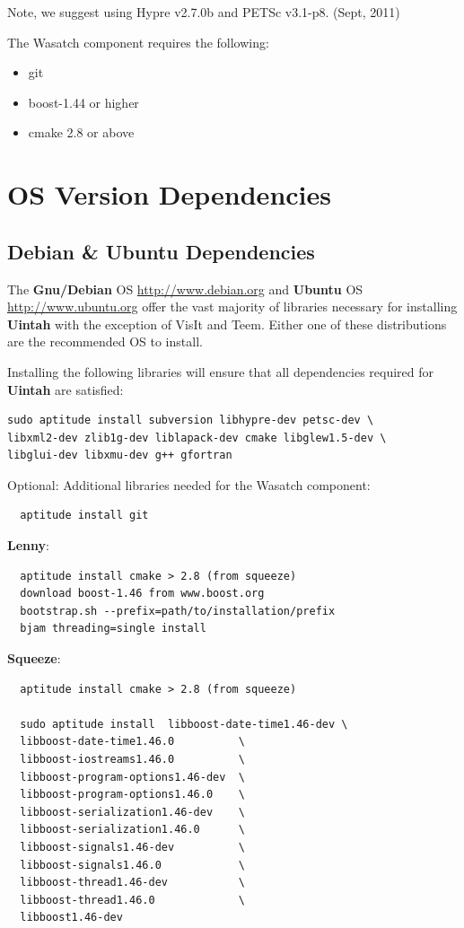 \documentclass[12pt]{article}
\begin{document}
Note, we suggest using Hypre v2.7.0b and PETSc v3.1-p8.  (Sept, 2011)

The Wasatch component requires the following:
\begin{itemize}
  \item git
  \item boost-1.44 or higher
  \item cmake 2.8 or above
\end{itemize}
\section{OS Version Dependencies}

\subsection{Debian \& Ubuntu Dependencies}
\label{sec:debian_dependencies}
The \textbf{Gnu/Debian} OS \url{http://www.debian.org} and
\textbf{Ubuntu} OS \url{http://www.ubuntu.org} offer the vast majority
of libraries necessary for installing \textbf{Uintah} with the
exception of VisIt and Teem.  Either one of these distributions are
the recommended OS to install.

Installing the following libraries will ensure that all dependencies
required for \textbf{Uintah} are satisfied:

\begin{verbatim} 
sudo aptitude install subversion libhypre-dev petsc-dev \ 
libxml2-dev zlib1g-dev liblapack-dev cmake libglew1.5-dev \
libglui-dev libxmu-dev g++ gfortran
\end{verbatim}

\noindent Optional: Additional libraries needed for the Wasatch component:
\begin{verbatim}
  aptitude install git
\end{verbatim}  
 \hspace{0.125in} \textbf{Lenny}:
\begin{verbatim}
  aptitude install cmake > 2.8 (from squeeze)
  download boost-1.46 from www.boost.org
  bootstrap.sh --prefix=path/to/installation/prefix
  bjam threading=single install
\end{verbatim}
\hspace{0.125in} \textbf{Squeeze}:
\begin{verbatim}
  aptitude install cmake > 2.8 (from squeeze)
  
  sudo aptitude install  libboost-date-time1.46-dev \
  libboost-date-time1.46.0          \
  libboost-iostreams1.46.0          \   
  libboost-program-options1.46-dev  \
  libboost-program-options1.46.0    \
  libboost-serialization1.46-dev    \
  libboost-serialization1.46.0      \
  libboost-signals1.46-dev          \
  libboost-signals1.46.0            \
  libboost-thread1.46-dev           \
  libboost-thread1.46.0             \
  libboost1.46-dev
\end{verbatim}
\end{document}
